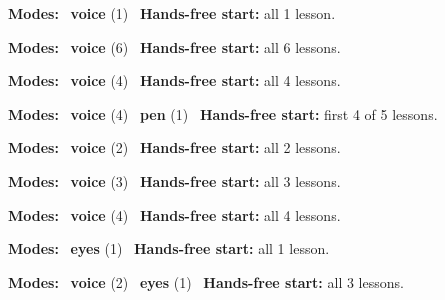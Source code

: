 \expandafter\def\csname hlchaptermodality31\endcsname{%
  {\small\noindent
    \textbf{Modes:} \hlvoicesign{}~\textbf{voice} (1)\quad
    \hlvoicesign{}~\textbf{Hands-free start:} all 1 lesson.%
    \par}\medskip
}

\expandafter\def\csname hlchaptermodality32\endcsname{%
  {\small\noindent
    \textbf{Modes:} \hlvoicesign{}~\textbf{voice} (6)\quad
    \hlvoicesign{}~\textbf{Hands-free start:} all 6 lessons.%
    \par}\medskip
}

\expandafter\def\csname hlchaptermodality33\endcsname{%
  {\small\noindent
    \textbf{Modes:} \hlvoicesign{}~\textbf{voice} (4)\quad
    \hlvoicesign{}~\textbf{Hands-free start:} all 4 lessons.%
    \par}\medskip
}

\expandafter\def\csname hlchaptermodality34\endcsname{%
  {\small\noindent
    \textbf{Modes:} \hlvoicesign{}~\textbf{voice} (4) \quad \hlpensign{}~\textbf{pen} (1)\quad
    \hlvoicesign{}~\textbf{Hands-free start:} first 4 of 5 lessons.%
    \par}\medskip
}

\expandafter\def\csname hlchaptermodality35\endcsname{%
  {\small\noindent
    \textbf{Modes:} \hlvoicesign{}~\textbf{voice} (2)\quad
    \hlvoicesign{}~\textbf{Hands-free start:} all 2 lessons.%
    \par}\medskip
}

\expandafter\def\csname hlchaptermodality36\endcsname{%
  {\small\noindent
    \textbf{Modes:} \hlvoicesign{}~\textbf{voice} (3)\quad
    \hlvoicesign{}~\textbf{Hands-free start:} all 3 lessons.%
    \par}\medskip
}

\expandafter\def\csname hlchaptermodality37\endcsname{%
  {\small\noindent
    \textbf{Modes:} \hlvoicesign{}~\textbf{voice} (4)\quad
    \hlvoicesign{}~\textbf{Hands-free start:} all 4 lessons.%
    \par}\medskip
}

\expandafter\def\csname hlchaptermodality38\endcsname{%
  {\small\noindent
    \textbf{Modes:} \hlsightsign{}~\textbf{eyes} (1)\quad
    \hlvoicesign{}~\textbf{Hands-free start:} all 1 lesson.%
    \par}\medskip
}

\expandafter\def\csname hlchaptermodality39\endcsname{%
  {\small\noindent
    \textbf{Modes:} \hlvoicesign{}~\textbf{voice} (2) \quad \hlsightsign{}~\textbf{eyes} (1)\quad
    \hlvoicesign{}~\textbf{Hands-free start:} all 3 lessons.%
    \par}\medskip
}

